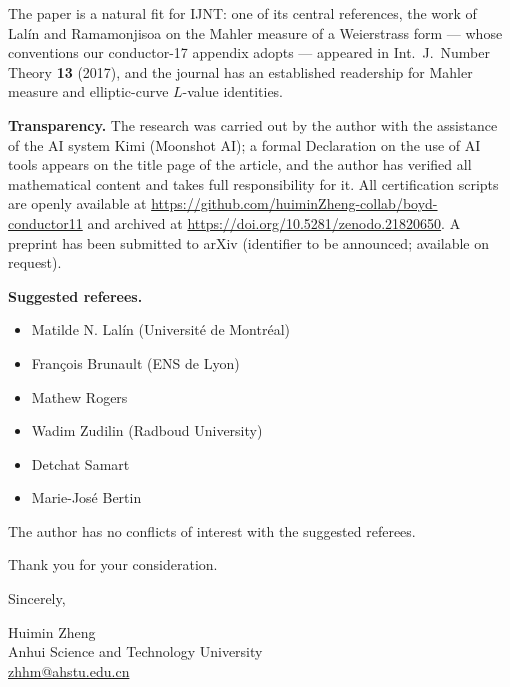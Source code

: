 \documentclass[11pt]{article}
\begin{document}
The paper is a natural fit for IJNT: one of its central references,
the work of Lal\'in and Ramamonjisoa on the Mahler measure of a
Weierstrass form --- whose conventions our conductor-17 appendix
adopts --- appeared in Int.\ J.\ Number Theory \textbf{13} (2017),
and the journal has an established readership for Mahler measure and
elliptic-curve $L$-value identities.

\textbf{Transparency.} The research was carried out by the author with
the assistance of the AI system Kimi (Moonshot AI); a formal
Declaration on the use of AI tools appears on the title page of the
article, and the author has verified all mathematical content and
takes full responsibility for it. All certification scripts are openly
available at \url{https://github.com/huiminZheng-collab/boyd-conductor11}
and archived at \url{https://doi.org/10.5281/zenodo.21820650}. A
preprint has been submitted to arXiv (identifier to be announced;
available on request).

\textbf{Suggested referees.}
\begin{itemize}
\item Matilde N. Lal\'in (Universit\'e de Montr\'eal)
\item Fran\c{c}ois Brunault (ENS de Lyon)
\item Mathew Rogers
\item Wadim Zudilin (Radboud University)
\item Detchat Samart
\item Marie-Jos\'e Bertin
\end{itemize}
The author has no conflicts of interest with the suggested referees.

Thank you for your consideration.

\vspace{2em}
Sincerely,

Huimin Zheng\\
Anhui Science and Technology University\\
\url{zhhm@ahstu.edu.cn}
\end{document}
